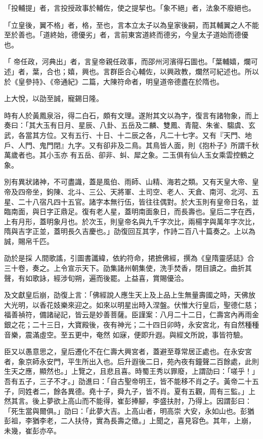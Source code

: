 \begin{pinyinscope}
 「投輔提」者，言投授政事於輔佐，使之提挈也。「象不絕」者，法象不廢絕也。



 「立皇後，翼不格」者，格，至也，言本立太子以為皇家後嗣，而其輔翼之人不能至於善也。「道終始，德優劣」者，言前東宮道終而德劣，今皇太子道始而德優也。



 「
 帝任政，河典出」者，言皇帝親任政事，而邵州河濱得石圖也。「葉輔嬉，爛可述」者，葉，合也；嬉，興也。言群臣合心輔佐，以興政教，爛然可紀述也。所以於《皇參持》、《帝通紀》二篇，大陳符命者，明皇道帝德盡在於隋也。



 上大悅，以劭至誠，寵錫日隆。



 時有人於黃鳳泉浴，得二白石，頗有文理。遂附其文以為字，復言有諸物象，而上奏曰：「其大玉有日月、星辰、八卦、五岳及二麟、雙鳳、青龍、朱雀、騶虞、玄武，各當其方位。又有五行、十日、十二辰之各，凡二十七字。又有『天門、地戶、人門、鬼門閉』九字。又有卻非及二鳥。其鳥皆人面，則《抱朴子》所謂千秋萬歲者也。其小玉亦
 有五岳、卻非、虯、犀之象。二玉俱有仙人玉女乘雲控鶴之象。



 別有異狀諸神，不可盡識，蓋是風伯、雨師、山精、海若之類。又有天皇大帝、皇帝及四帝坐，鉤陳、北斗、三公、天將軍、土司空、老人、天倉、南河、北河、五星、二十八宿凡四十五官。諸字本無行伍，皆往往偶對。於大玉則有皇帝日名，並臨南面，與日字正鼎足。復有老人星，蓋明南面象日，而長壽也。皇后二字在西，上有月形，蓋明象月也。於次玉，則皇帝名與九千字次比，兩楊字與萬年字次比，隋與吉字正並，蓋明長久吉慶也。」劭復回互其字，作詩二百八十篇奏之。上以為誠，賜帛千匹。



 劭於是採
 人間歌謠，引圖書讖緯，依約符命，捃摭佛經，撰為《皇隋靈感誌》合三十卷，奏之。上令宣示天下。劭集諸州朝集使，洗手焚香，閉目讀之。曲折其聲，有如歌詠，經涉旬朔，遍而後罷。上益喜，賞賜優洽。



 及文獻皇后崩，劭復上言：「佛經說人應生天上及上品上生無量壽國之時，天佛放大光明，以香花妓樂來迎之。如來以明星出時入涅盤。伏惟大行皇后，聖德仁慈；福善禎符，備諸祕記，皆云是妙善菩薩。臣謹案：八月二十二日，仁壽宮內再雨金銀之花；二十三日，大寶殿後，夜有神光；二十四日卯時，永安宮北，有自然種種音樂，震滿虛空。至五更中，奄然
 如寐，便即升遐。與經文所說，事皆符驗。



 臣又以愚意思之，皇后遷化不在仁壽大興宮者，蓋避至尊常居正處也。在永安宮者，象京師永安門，平生所出入也。后升遐後二日，苑內夜有鐘聲二百餘處，此則生天之應，顯然也。」上覽之，且悲且喜。時蜀王秀以罪廢，上謂劭曰：「嗟乎！」吾有五子，三子不才。」劭進曰：「自古聖帝明王，皆不能移不肖之子。黃帝二十五子，同姓者二，餘各異德。堯十子，舜九子，皆不肖。夏有五觀，周有三監。」上然其言。後上夢欲上高山而不能得，崔彭捧腳，李盛扶肘，乃得上。因謂彭曰：「死生當與爾俱。」劭曰：「此夢大吉。上高山者，明高崇
 大安，永如山也。彭猶彭祖，李猶李老，二人扶侍，實為長壽之徵。」上聞之，喜見容色。其年，上崩，未幾，崔彭亦卒。




\end{pinyinscope}
